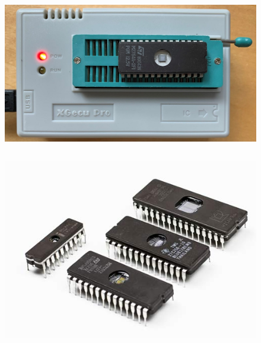 \begin{frame}
\begin{columns}
		\begin{figure}[!htbp]
			\centering 
			\includegraphics[width=1.0\linewidth]{images/5_memory/eprom_programmer.jpg}
		\end{figure}
	\end{columns}
	
	\begin{figure}[!htbp] 
		\centering
		\includegraphics[width=0.5\linewidth]{images/5_memory/eproms.jpg }
	\end{figure}
	
\end{frame}



